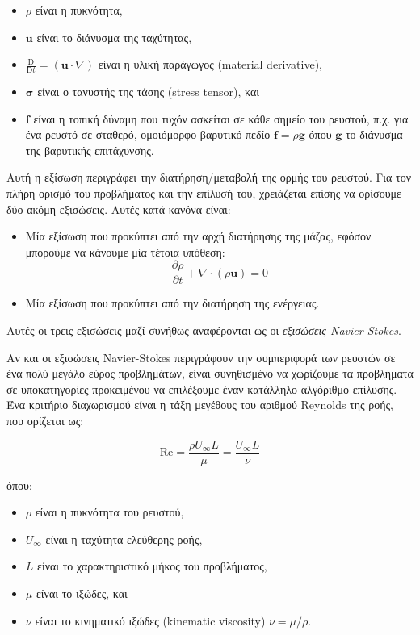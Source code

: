 \begin{itemize}
    \item $\rho$ είναι η πυκνότητα,
    \item $\mathbf{u}$ είναι το διάνυσμα της ταχύτητας,
    \item $\frac{\mathrm{D}}{\mathrm{D}t} = (\mathbf{u} \cdot \nabla )$ είναι η υλική παράγωγος (material derivative),
    \item $\mathbf{\sigma}$ είναι ο τανυστής της τάσης (stress tensor), και
    \item $\mathbf{f}$ είναι η τοπική δύναμη που τυχόν ασκείται σε κάθε σημείο του ρευστού, π.χ. για ένα ρευστό σε σταθερό, ομοιόμορφο βαρυτικό πεδίο $\mathbf{f} = \rho \mathbf{g}$ όπου $\mathbf{g}$ το διάνυσμα της βαρυτικής επιτάχυνσης.
\end{itemize}

Αυτή η εξίσωση περιγράφει την διατήρηση/μεταβολή της ορμής του ρευστού.
Για τον πλήρη ορισμό του προβλήματος και την επίλυσή του, χρειάζεται επίσης να ορίσουμε δύο ακόμη εξισώσεις.
Αυτές κατά κανόνα είναι:

\begin{itemize}
    \item Μία εξίσωση που προκύπτει από την αρχή διατήρησης της μάζας, εφόσον μπορούμε να κάνουμε μία τέτοια υπόθεση:
        \begin{equation*}
            \frac{\partial \rho}{\partial t} + \nabla \cdot \left( \rho \mathbf{u} \right) = 0
        \end{equation*}
    \item Μία εξίσωση που προκύπτει από την διατήρηση της ενέργειας.
\end{itemize}

Αυτές οι τρεις εξισώσεις μαζί συνήθως αναφέρονται ως οι \emph{εξισώσεις Navier-Stokes}.

Αν και οι εξισώσεις Navier-Stokes περιγράφουν την συμπεριφορά των ρευστών σε ένα πολύ μεγάλο εύρος προβλημάτων, είναι συνηθισμένο να χωρίζουμε τα προβλήματα σε υποκατηγορίες προκειμένου να επιλέξουμε έναν κατάλληλο αλγόριθμο επίλυσης.
Ένα κριτήριο διαχωρισμού είναι η τάξη μεγέθους του αριθμού Reynolds της ροής, που ορίζεται ως:

\begin{equation*}
    \mathrm{Re} = \frac{\rho U_{\infty} L}{\mu} = \frac{U_\infty L}{\nu}
\end{equation*}

όπου:

\begin{itemize}
    \item $\rho$ είναι η πυκνότητα του ρευστού,
    \item $U_{\infty}$ είναι η ταχύτητα ελεύθερης ροής,
    \item $L$ είναι το χαρακτηριστικό μήκος του προβλήματος,
    \item $\mu$ είναι το ιξώδες, και
    \item $\nu$ είναι το κινηματικό ιξώδες (kinematic viscosity) $\nu = \mu / \rho$.
\end{itemize}

